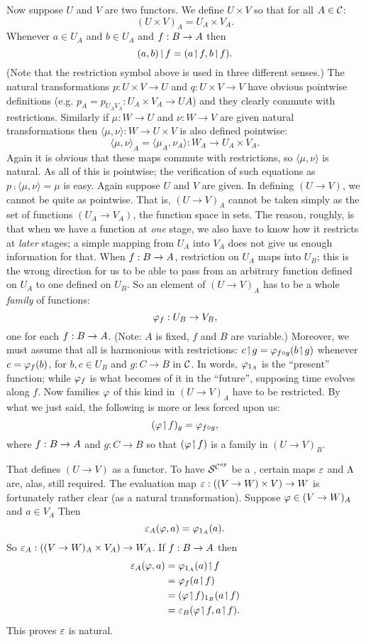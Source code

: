 Now suppose $U$ and $V$ are two functors. We define $U \times V$ so that for all $A \in
\mathcal C$:
$$
(U \times V)_A = U_A \times V_A .
$$
%
Whenever $a \in U_A$ and $b \in U_A$ and $f: B \rightarrow A$ then
$$
(a,b) \!\upharpoonleft\! f = (a \!\upharpoonleft\! f, b \!\upharpoonleft\! f) .
$$
(Note that the restriction symbol above is used in three different senses.) The natural
transformations $p : U \times V \to U$ and $q: U\times V \to V$ have obvious pointwise
definitions  (e.g. $p_A= p_{{U_A}{V_A}} : U_A \times V_A \to UA$) and they clearly commute
with restrictions. Similarly if $\mu: W \to U$ and $\nu: W\to V$ are given natural
transformations then $\langle \mu, \nu \rangle: W \to U \times V$ is also defined
pointwise:
$$
{\langle \mu, \nu \rangle}_A = \langle \mu_A, \nu_A \rangle : W_A \to U_A \times V_A .
$$
%
Again it is obvious that these maps commute with restrictions, so ${\langle \mu, \nu
\rangle}$ is natural. As all of this is pointwise; the verification of such equations as
$p \comp \langle \mu, \nu \rangle = \mu$ is easy. Again suppose $U$ and $V$ are given. In
defining $(U \to V)$, we cannot be quite as pointwise. That is, $(U \to V)_A$ cannot be
taken simply as the set of functions $(U_A \to V_A)$, the function space in sets. The
reason, roughly, is that when we have a function at {\it one} stage, we also have to know
how it restricts at {\it later} stages; a simple mapping from $U_A$ into $V_A$ does not
give us enough information for that. When $f : B \rightarrow A$, restriction on $U_A$ maps into $U_B$;
this is the wrong direction for us to be able to pass from an arbitrary function defined
on $U_A$ to one defined on $U_B$. So an element of $(U \to V)_A$ has to be a whole {\it
family} of functions:
$$
\varphi_f: U_B \rightarrow V_B,
$$
%
one for each $f: B \rightarrow A$. (Note: $A$ is fixed, $f$ and $B$ are variable.) Moreover, we must
assume that all is harmonious with restrictions: $c \!\upharpoonleft\! g = \varphi_{f \circ g} (b \!\upharpoonleft\! g)$
whenever $c = \varphi_f(b)$, for $b,c \in U_B$ and $g : C\to B$ in $\mathcal C$. In words,
$\varphi_{{\mathrm 1}_A}$ is the ``present'' function; while $\varphi_f$ is what becomes of it in the
``future'', supposing time evolves along $f$. Now families $\varphi$ of this kind in $(U\to
V)_A$ have to be restricted. By what we just said, the following is more or less forced
upon us:
$$
(\varphi \!\upharpoonleft\! f)_g = \varphi_{f\circ g},
$$
%
where $f : B \rightarrow A$ and $g: C\to B$ so that $(\varphi \!\upharpoonleft\! f)$ is a family in $(U\to V)_B$.

That defines $(U\to V)$ as a functor. To have $\mathcal S^{\mathcal C^{op}}$ be a \ccc, certain maps $\varepsilon$ and
$\Lambda$ are, alas, still required. The evaluation map $\varepsilon : ((V\rightarrow W) \times V) \rightarrow W$ is
fortunately rather clear (as a natural transformation). Suppose $\varphi \in (V \rightarrow W)_A$
and $a \in V_A$ Then
$$
\varepsilon_A(\varphi, a) = \varphi_{{\mathrm 1}_A} (a).
$$
%
So $\varepsilon_A : ((V \rightarrow W)_A \times V_A) \rightarrow W_A$. If $f: B \rightarrow A$ then
\begin{align*}
\ev_A(\ffam, a) &= \ffam_{\id_A}(a) \res f\\
&= \ffam_f(a \res f)\\
&= (\ffam \res f)_{\id_B} (a \res f)\\
&= \ev_B(\ffam \res f, a \res f).
\end{align*}
%
This proves $\varepsilon$ is natural.

